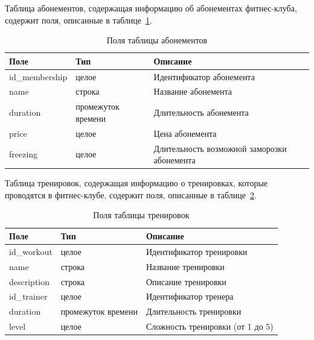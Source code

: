 Таблица абонементов, содержащая информацию об абонементах фитнес-клуба, содержит поля, описанные в таблице~\ref{tbl:pol_mem}.
\begin{table}[h!]
	\begin{center}
		\begin{threeparttable}
			\captionsetup{justification=raggedright,singlelinecheck=off}
			\caption{\label{tbl:pol_mem} Поля таблицы абонементов}
			\begin{tabular}{|p{4cm}|p{4cm}|p{6cm}|}
				\hline
				Поле & Тип & Описание \\
				\hline
				id\_membership & целое & Идентификатор абонемента \\
				\hline
				name & строка & Название абонемента \\
				\hline
				duration & промежуток времени & Длительность абонемента \\
				\hline
				price & целое & Цена абонемента \\
				\hline
				freezing & целое & Длительность возможной заморозки абонемента \\
				\hline
			\end{tabular}
		\end{threeparttable}
	\end{center}
\end{table}

Таблица тренировок, содержащая информацию о тренировках, которые проводятся в фитнес-клубе, содержит поля, описанные в таблице~\ref{tbl:pol_work}.
\begin{table}[h!]
	\begin{center}
		\begin{threeparttable}
			\captionsetup{justification=raggedright,singlelinecheck=off}
			\caption{\label{tbl:pol_work} Поля таблицы тренировок}
			\begin{tabular}{|p{4cm}|p{4cm}|p{6cm}|}
				\hline
				Поле & Тип & Описание \\
				\hline
				id\_workout & целое & Идентификатор тренировки \\
				\hline
				name & строка & Название тренировки \\
				\hline
				description & строка & Описание тренировки \\
				\hline
				id\_trainer & целое & Идентификатор тренера \\
				\hline
				duration & промежуток времени & Длительность тренировки \\
				\hline
				level & целое & Сложность тренировки (от 1 до 5) \\
				\hline
			\end{tabular}
		\end{threeparttable}
	\end{center}
\end{table}

